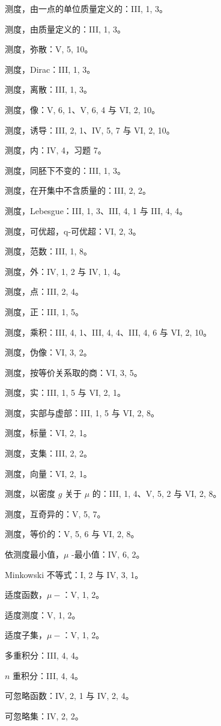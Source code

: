 测度，由一点的单位质量定义的：III, 1, 3。

测度，由质量定义的：III, 1, 3。

测度，弥散：V, 5, 10。

测度，Dirac：III, 1, 3。

测度，离散：III, 1, 3。

测度，像：V, 6, 1、V, 6, 4 与 VI, 2, 10。

测度，诱导：III, 2, 1、IV, 5, 7 与 VI, 2, 10。

测度，内：IV, 4，习题 7。

测度，同胚下不变的：III, 1, 3。

测度，在开集中不含质量的：III, 2, 2。

测度，Lebesgue：III, 1, 3、III, 4, 1 与 III, 4, 4。

测度，可优超，q-可优超：VI, 2, 3。

测度，范数：III, 1, 8。

测度，外：IV, 1, 2 与 IV, 1, 4。

测度，点：III, 2, 4。

测度，正：III, 1, 5。

测度，乘积：III, 4, 1、III, 4, 4、III, 4, 6 与 VI, 2, 10。

测度，伪像：VI, 3, 2。

测度，按等价关系取的商：VI, 3, 5。

测度，实：III, 1, 5 与 VI, 2, 1。

测度，实部与虚部：III, 1, 5 与 VI, 2, 8。

测度，标量：VI, 2, 1。

测度，支集：III, 2, 2。

测度，向量：VI, 2, 1。

测度，以密度 \(g\) 关于 \(\mu\) 的：III, 1, 4、V, 5, 2 与 VI, 2, 8。

测度，互奇异的：V, 5, 7。

测度，等价的：V, 5, 6 与 VI, 2, 8。

依测度最小值，\(\mu\) -最小值：IV, 6, 2。

Minkowski 不等式：I, 2 与 IV, 3, 1。

适度函数，\(\mu-\)：V, 1, 2。

适度测度：V, 1, 2。

适度子集，\(\mu-\)：V, 1, 2。

多重积分：III, 4, 4。

\(n\) 重积分：III, 4, 4。

可忽略函数：IV, 2, 1 与 IV, 2, 4。

可忽略集：IV, 2, 2。

